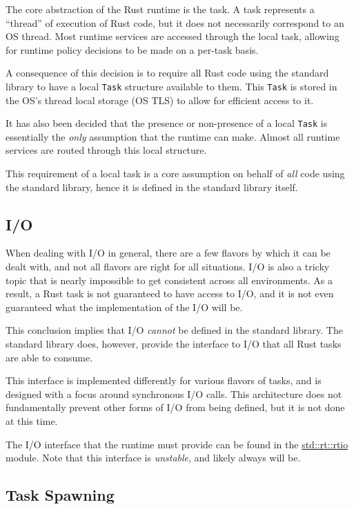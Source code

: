 \documentclass[]{article}
\begin{document}
The core abstraction of the Rust runtime is the task. A task represents
a ``thread'' of execution of Rust code, but it does not necessarily
correspond to an OS thread. Most runtime services are accessed through
the local task, allowing for runtime policy decisions to be made on a
per-task basis.

A consequence of this decision is to require all Rust code using the
standard library to have a local \texttt{Task} structure available to
them. This \texttt{Task} is stored in the OS's thread local storage (OS
TLS) to allow for efficient access to it.

It has also been decided that the presence or non-presence of a local
\texttt{Task} is essentially the \emph{only} assumption that the runtime
can make. Almost all runtime services are routed through this local
structure.

This requirement of a local task is a core assumption on behalf of
\emph{all} code using the standard library, hence it is defined in the
standard library itself.

\subsection{I/O}\label{io}

When dealing with I/O in general, there are a few flavors by which it
can be dealt with, and not all flavors are right for all situations. I/O
is also a tricky topic that is nearly impossible to get consistent
across all environments. As a result, a Rust task is not guaranteed to
have access to I/O, and it is not even guaranteed what the
implementation of the I/O will be.

This conclusion implies that I/O \emph{cannot} be defined in the
standard library. The standard library does, however, provide the
interface to I/O that all Rust tasks are able to consume.

This interface is implemented differently for various flavors of tasks,
and is designed with a focus around synchronous I/O calls. This
architecture does not fundamentally prevent other forms of I/O from
being defined, but it is not done at this time.

The I/O interface that the runtime must provide can be found in the
\href{std/rt/rtio/trait.IoFactory.html}{std::rt::rtio} module. Note that
this interface is \emph{unstable}, and likely always will be.

\subsection{Task Spawning}\label{task-spawning}
\end{document}
